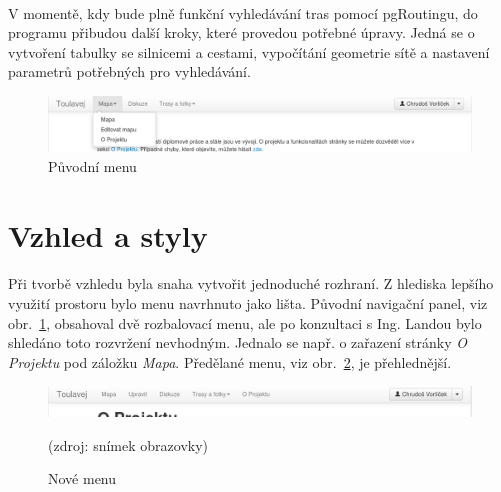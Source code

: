 \documentclass[11pt,a4paper,titlepage,oneside]{book}
\begin{document}
			\paragraph{} V momentě, kdy bude plně funkční vyhledávání tras pomocí pgRoutingu, do programu přibudou další kroky, které provedou potřebné úpravy. Jedná se o vytvoření tabulky se silnicemi a cestami, vypočítání geometrie sítě a nastavení parametrů potřebných pro vyhledávání.

		\begin{figure}[!h]
			\begin{center}
				\includegraphics[width=12cm]{obrazky/toulavej/menu_puv.png}
				\caption{Původní menu}
				\label{fig:menu_puv}
			\end{center}
		\end{figure}	

		\section{Vzhled a styly}


			\paragraph{} Při tvorbě vzhledu byla snaha vytvořit jednoduché rozhraní. Z hlediska lepšího využití prostoru bylo menu navrhnuto jako lišta. Původní navigační panel, viz obr.~\ref{fig:menu_puv}, obsahoval dvě rozbalovací menu, ale po konzultaci s Ing. Landou bylo shledáno toto rozvržení nevhodným. Jednalo se např. o zařazení stránky \textit{O Projektu} pod záložku \textit{Mapa}. Předělané menu, viz obr.~\ref{fig:menu_nove}, je přehlednější.
		\begin{figure}[!h]
			\begin{center}
				\includegraphics[width=12cm]{obrazky/toulavej/menu_nove.png}
				\caption{Nové menu}
				\label{fig:menu_nove}
				(zdroj: snímek obrazovky)
			\end{center}
		\end{figure}	
\end{document}
